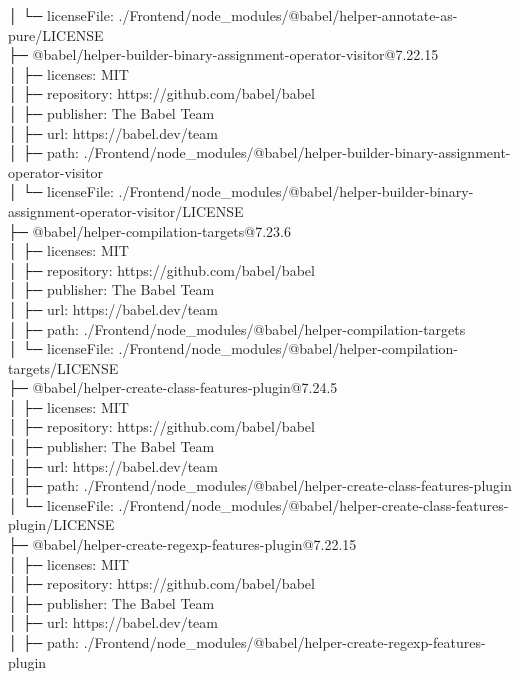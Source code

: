 │  └─ licenseFile: ./Frontend/node\_modules/@babel/helper-annotate-as-pure/LICENSE\\
├─ @babel/helper-builder-binary-assignment-operator-visitor@7.22.15\\
│  ├─ licenses: MIT\\
│  ├─ repository: https://github.com/babel/babel\\
│  ├─ publisher: The Babel Team\\
│  ├─ url: https://babel.dev/team\\
│  ├─ path: ./Frontend/node\_modules/@babel/helper-builder-binary-assignment-operator-visitor\\
│  └─ licenseFile: ./Frontend/node\_modules/@babel/helper-builder-binary-assignment-operator-visitor/LICENSE\\
├─ @babel/helper-compilation-targets@7.23.6\\
│  ├─ licenses: MIT\\
│  ├─ repository: https://github.com/babel/babel\\
│  ├─ publisher: The Babel Team\\
│  ├─ url: https://babel.dev/team\\
│  ├─ path: ./Frontend/node\_modules/@babel/helper-compilation-targets\\
│  └─ licenseFile: ./Frontend/node\_modules/@babel/helper-compilation-targets/LICENSE\\
├─ @babel/helper-create-class-features-plugin@7.24.5\\
│  ├─ licenses: MIT\\
│  ├─ repository: https://github.com/babel/babel\\
│  ├─ publisher: The Babel Team\\
│  ├─ url: https://babel.dev/team\\
│  ├─ path: ./Frontend/node\_modules/@babel/helper-create-class-features-plugin\\
│  └─ licenseFile: ./Frontend/node\_modules/@babel/helper-create-class-features-plugin/LICENSE\\
├─ @babel/helper-create-regexp-features-plugin@7.22.15\\
│  ├─ licenses: MIT\\
│  ├─ repository: https://github.com/babel/babel\\
│  ├─ publisher: The Babel Team\\
│  ├─ url: https://babel.dev/team\\
│  ├─ path: ./Frontend/node\_modules/@babel/helper-create-regexp-features-plugin\\
